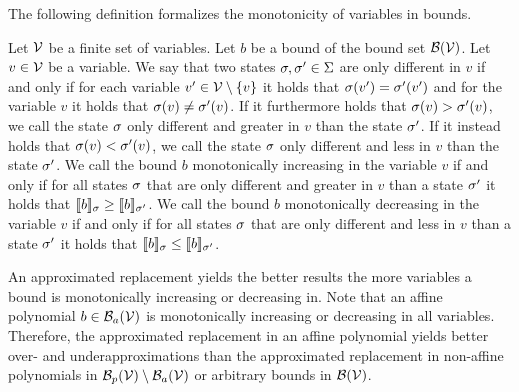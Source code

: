 The following definition formalizes the monotonicity of variables in bounds.

\begin{definition}
  Let $\mathcal{V}$ be a finite set of variables.
  Let $b$ be a bound of the bound set $\mathcal{B}(\mathcal{V})$.
  Let $v \in \mathcal{V}$ be a variable.
  We say that two states $\sigma, \sigma' \in \Sigma$ are only different in $v$ if and only if for each variable $v' \in \mathcal{V} \setminus \lbrace v \rbrace$ it holds that $\sigma(v') = \sigma'(v')$ and for the variable $v$ it holds that $\sigma(v) \neq \sigma'(v)$.
  If it furthermore holds that $\sigma(v) > \sigma'(v)$, we call the state $\sigma$ only different and greater in $v$ than the state $\sigma'$.
  If it instead holds that $\sigma(v) < \sigma'(v)$, we call the state $\sigma$ only different and less in $v$ than the state $\sigma'$.
  We call the bound $b$ monotonically increasing in the variable $v$ if and only if for all states $\sigma$ that are only different and greater in $v$ than a state $\sigma'$ it holds that $\llbracket b \rrbracket_{\sigma} \geq \llbracket b \rrbracket_{\sigma'}$.
  We call the bound $b$ monotonically decreasing in the variable $v$ if and only if for all states $\sigma$ that are only different and less in $v$ than a state $\sigma'$ it holds that $\llbracket b \rrbracket_{\sigma} \leq \llbracket b \rrbracket_{\sigma'}$.
\end{definition}

An approximated replacement yields the better results the more variables a bound is monotonically increasing or decreasing in.
Note that an affine polynomial $b \in \mathcal{B}_a(\mathcal{V})$ is monotonically increasing or decreasing in all variables.
Therefore, the approximated replacement in an affine polynomial yields better over- and underapproximations than the approximated replacement in non-affine polynomials in $\mathcal{B}_p(\mathcal{V}) \setminus \mathcal{B}_a(\mathcal{V})$ or arbitrary bounds in $\mathcal{B}(\mathcal{V})$.
